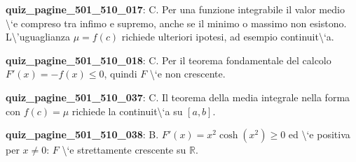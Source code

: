 \documentclass[11pt,a4paper]{article}
\newcounter{quiz}
\begin{document}
\noindent\textbf{quiz\_pagine\_501\_510\_017}: C. Per una funzione integrabile il valor medio \textbackslash{}`e compreso tra infimo e supremo, anche se il minimo o massimo non esistono. L\textbackslash{}'uguaglianza $\mu=f(c)$ richiede ulteriori ipotesi, ad esempio continuit\textbackslash{}`a.\par\medskip
\noindent\textbf{quiz\_pagine\_501\_510\_018}: C. Per il teorema fondamentale del calcolo $F\prime(x)=-f(x)\le0$, quindi $F$ \textbackslash{}`e non crescente.\par\medskip
\noindent\textbf{quiz\_pagine\_501\_510\_037}: C. Il teorema della media integrale nella forma con $f(c)=\mu$ richiede la continuit\textbackslash{}`a su $[a,b]$.\par\medskip
\noindent\textbf{quiz\_pagine\_501\_510\_038}: B. $F\prime(x)=x^2\cosh(x^2)\ge0$ ed \textbackslash{}`e positiva per $x\ne0$: $F$ \textbackslash{}`e strettamente crescente su $\mathbb R$.\par\medskip
\end{document}
